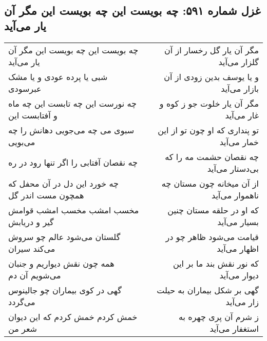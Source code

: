 \begin{center}
\section*{غزل شماره ۵۹۱: چه بویست این چه بویست این مگر آن یار می‌آید}
\label{sec:0591}
\begin{longtable}{l p{0.5cm} r}
چه بویست این چه بویست این مگر آن یار می‌آید
&&
مگر آن یار گل رخسار از آن گلزار می‌آید
\\
شبی یا پرده عودی و یا مشک عبرسودی
&&
و یا یوسف بدین زودی از آن بازار می‌آید
\\
چه نورست این چه تابست این چه ماه و آفتابست این
&&
مگر آن یار خلوت جو ز کوه و غار می‌آید
\\
سبوی می چه می‌جویی دهانش را چه می‌بویی
&&
تو پنداری که او چون تو از این خمار می‌آید
\\
چه نقصان آفتابی را اگر تنها رود در ره
&&
چه نقصان حشمت مه را که بی‌دستار می‌آید
\\
چه خورد این دل در آن محفل که همچون مست اندر گل
&&
از آن میخانه چون مستان چه ناهموار می‌آید
\\
مخسب امشب مخسب امشب قوامش گیر و دریابش
&&
که او در حلقه مستان چنین بسیار می‌آید
\\
گلستان می‌شود عالم چو سروش می‌کند سیران
&&
قیامت می‌شود ظاهر چو در اظهار می‌آید
\\
همه چون نقش دیواریم و جنبان می‌شویم آن دم
&&
که نور نقش بند ما بر این دیوار می‌آید
\\
گهی در کوی بیماران چو جالینوس می‌گردد
&&
گهی بر شکل بیماران به حیلت زار می‌آید
\\
خمش کردم خمش کردم که این دیوان شعر من
&&
ز شرم آن پری چهره به استغفار می‌آید
\\
\end{longtable}
\end{center}
